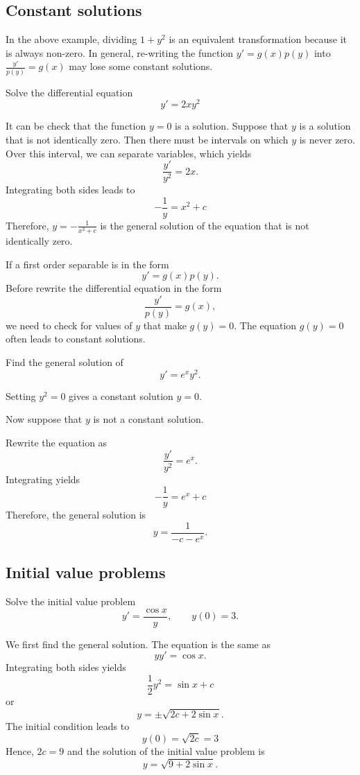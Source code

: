 \subsection{Constant solutions}

In the above example, dividing $1+y^2$ is an equivalent transformation because it is always non-zero. In general, re-writing the function $y'=g(x)p(y)$ into $\frac{y'}{p(y)}=g(x)$ may lose some constant solutions.

\begin{example}
  Solve the differential equation
  $$y'=2xy^2$$
\end{example}
\begin{solution}
  It can be check that the function $y=0$ is a solution. Suppose that $y$ is a solution that is not identically zero. Then there must be intervals on which $y$ is never zero. Over this interval, we can separate variables, which yields
$$
\frac{y'}{y^2}=2x.
$$
Integrating both sides leads to
$$
-\frac1y=x^2+c
$$
Therefore, $y=-\frac1{x^2+c}$ is the general solution of the equation that is not identically zero.
\end{solution}

\begin{remark}
If a first order separable is in the form
\[y'=g(x)p(y).\]
Before rewrite the differential equation in the form
\[
\frac{y'}{p(y)}=g(x),  
\]
we need to check for values of $y$ that make $g(y)=0.$ The equation $g(y)=0$ often leads to constant solutions.
\end{remark}

  \begin{exercise}
  Find the general solution of
  $$y'  =  e^x  y^2.$$
  \end{exercise}
  \begin{exersol}
  Setting $y^2=0$ gives a constant solution $y=0$.
  
  Now suppose that $y$ is not a constant solution.
  
  Rewrite the equation as
  $$\frac{y'}{y^2}  =e^x.$$
  Integrating yields
  $$-\frac{1}{y}=  e^x + c$$
  Therefore, the general solution is
  $$y = \frac{1}{-c - e^x}.$$
  \end{exersol}

\subsection{Initial value problems}
\begin{example}
  Solve the initial value problem
  \[y' = \frac{\cos x}{y}, \qquad y(0)   =  3.\]
\end{example}
\begin{solution}
  We first find the general solution.
  The equation is the same as
  \[yy' = \cos x. \]
  Integrating both sides yields
  \[\frac{1}{2}y^2 = \sin x + c\]
  or
  \[y = \pm \sqrt{2c+ 2\sin x}.\]
  The initial condition leads to
  \[y(0) = \sqrt{2c} = 3\]
  Hence, $2c=9$ and the solution of the initial value problem is
  \[y= \sqrt{9+ 2\sin x}.\]
\end{solution}


